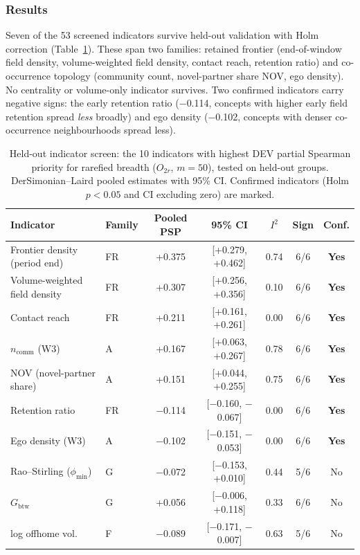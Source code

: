 \documentclass[11pt,letterpaper]{article}
\begin{document}
\subsubsection{Results}

Seven of the 53 screened indicators survive held-out validation with Holm correction (Table~\ref{tab:screen}). These span two families: retained frontier (end-of-window field density, volume-weighted field density, contact reach, retention ratio) and co-occurrence topology (community count, novel-partner share NOV, ego density). No centrality or volume-only indicator survives. Two confirmed indicators carry negative signs: the early retention ratio ($-$0.114, concepts with higher early field retention spread \emph{less} broadly) and ego density ($-$0.102, concepts with denser co-occurrence neighbourhoods spread less).

\begin{table}[!htbp]
\centering
\caption{Held-out indicator screen: the 10 indicators with highest DEV partial Spearman priority for rarefied breadth ($O_{2r}$, $m = 50$), tested on held-out groups. DerSimonian--Laird pooled estimates with 95\% CI. Confirmed indicators (Holm $p < 0.05$ and CI excluding zero) are marked.}
\label{tab:screen}
\small
\begin{tabular}{llccccc}
\toprule
Indicator & Family & Pooled PSP & 95\% CI & $I^2$ & Sign & Conf. \\
\midrule
Frontier density (period end) & FR & +0.375 & [+0.279, +0.462] & 0.74 & 6/6 & \textbf{Yes} \\
Volume-weighted field density & FR & +0.307 & [+0.256, +0.356] & 0.10 & 6/6 & \textbf{Yes} \\
Contact reach & FR & +0.211 & [+0.161, +0.261] & 0.00 & 6/6 & \textbf{Yes} \\
$n_\text{comm}$ (W3) & A & +0.167 & [+0.063, +0.267] & 0.78 & 6/6 & \textbf{Yes} \\
NOV (novel-partner share) & A & +0.151 & [+0.044, +0.255] & 0.75 & 6/6 & \textbf{Yes} \\
Retention ratio & FR & $-$0.114 & [$-$0.160, $-$0.067] & 0.00 & 6/6 & \textbf{Yes} \\
Ego density (W3) & A & $-$0.102 & [$-$0.151, $-$0.053] & 0.00 & 6/6 & \textbf{Yes} \\
Rao--Stirling ($\phi_{\min}$) & G & $-$0.072 & [$-$0.153, +0.010] & 0.44 & 5/6 & No \\
$G_\text{btw}$ & G & +0.056 & [$-$0.006, +0.118] & 0.33 & 6/6 & No \\
log offhome vol. & F & $-$0.089 & [$-$0.171, $-$0.007] & 0.63 & 5/6 & No \\
\bottomrule
\end{tabular}
\end{table}
\end{document}
